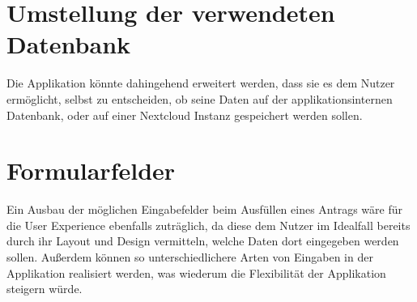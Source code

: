 \section{Umstellung der verwendeten Datenbank}\label{umstellung der verwendeten datenbank}
Die Applikation könnte dahingehend erweitert werden, dass sie es dem Nutzer ermöglicht, 
selbst zu entscheiden, ob seine Daten auf der applikationsinternen Datenbank, oder auf einer
Nextcloud Instanz gespeichert werden sollen. 


\section{Formularfelder}\label{sec: formularfelder}
Ein Ausbau der möglichen Eingabefelder beim Ausfüllen eines Antrags wäre für die
User Experience ebenfalls zuträglich, da diese dem Nutzer im Idealfall bereits durch ihr
Layout und Design vermitteln, welche Daten dort eingegeben werden sollen.
Außerdem können so unterschiedlichere Arten von Eingaben in der Applikation realisiert werden, was wiederum
die Flexibilität der Applikation steigern würde.

